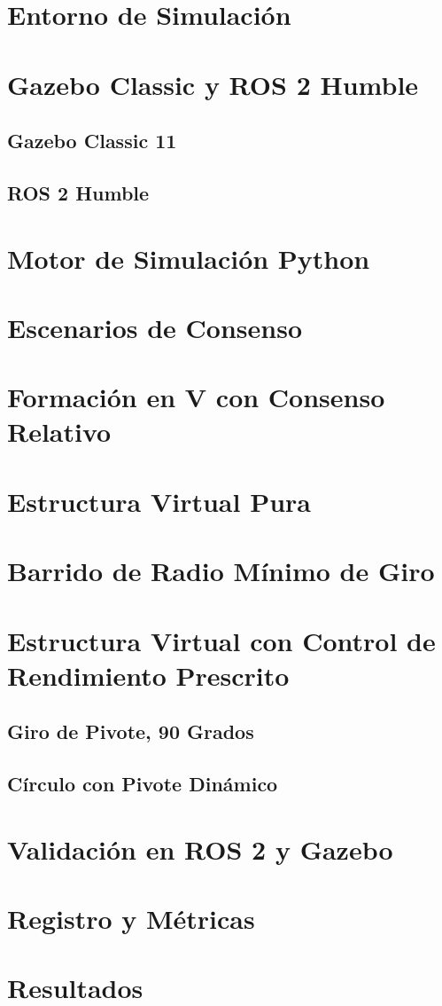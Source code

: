 \section{Entorno de Simulación}
\section{Gazebo Classic y ROS 2 Humble}
\subsection{Gazebo Classic 11}
\subsection{ROS 2 Humble}
\section{Motor de Simulación Python}
\section{Escenarios de Consenso}
\section{Formación en V con Consenso Relativo}
\section{Estructura Virtual Pura}
\section{Barrido de Radio Mínimo de Giro}
\section{Estructura Virtual con Control de Rendimiento Prescrito}
\subsection{Giro de Pivote, 90 Grados}
\subsection{Círculo con Pivote Dinámico}
\section{Validación en ROS 2 y Gazebo}
\section{Registro y Métricas}
\section{Resultados}
